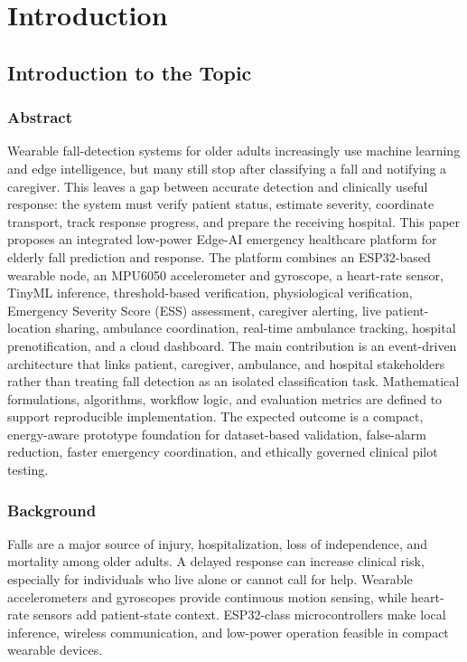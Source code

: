 \chapter{Introduction}

\section[Introduction to the Topic]{\textbf{Introduction to the Topic}}

\subsection{Abstract}
Wearable fall-detection systems for older adults increasingly use machine learning and edge intelligence, but many still stop after classifying a fall and notifying a caregiver. This leaves a gap between accurate detection and clinically useful response: the system must verify patient status, estimate severity, coordinate transport, track response progress, and prepare the receiving hospital. This paper proposes an integrated low-power Edge-AI emergency healthcare platform for elderly fall prediction and response. The platform combines an ESP32-based wearable node, an MPU6050 accelerometer and gyroscope, a heart-rate sensor, TinyML inference, threshold-based verification, physiological verification, Emergency Severity Score (ESS) assessment, caregiver alerting, live patient-location sharing, ambulance coordination, real-time ambulance tracking, hospital prenotification, and a cloud dashboard. The main contribution is an event-driven architecture that links patient, caregiver, ambulance, and hospital stakeholders rather than treating fall detection as an isolated classification task. Mathematical formulations, algorithms, workflow logic, and evaluation metrics are defined to support reproducible implementation. The expected outcome is a compact, energy-aware prototype foundation for dataset-based validation, false-alarm reduction, faster emergency coordination, and ethically governed clinical pilot testing.

\subsection{Background}
Falls are a major source of injury, hospitalization, loss of independence, and mortality among older adults. A delayed response can increase clinical risk, especially for individuals who live alone or cannot call for help. Wearable accelerometers and gyroscopes provide continuous motion sensing, while heart-rate sensors add patient-state context. ESP32-class microcontrollers make local inference, wireless communication, and low-power operation feasible in compact wearable devices.

